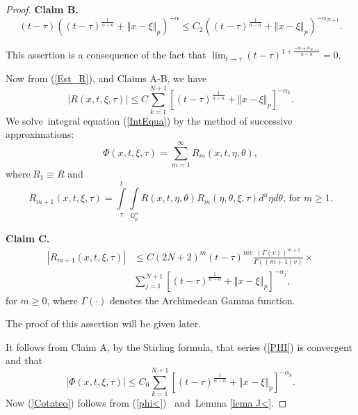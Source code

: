 \documentclass{amsart}\usepackage{amsfonts}
\theoremstyle{plain}
\numberwithin{equation}{section}
\begin{document}
\begin{proof}
\textbf{Claim B.}
\[
\left(  t-\tau\right)  ((t-\tau)^{\frac{1}{\alpha-n}}+\left\Vert
x-\xi\right\Vert _{p})^{-\alpha}\leq C_{2}((t-\tau)^{\frac{1}{\alpha-n}}+\left\Vert x-\xi\right\Vert _{p})^{-\alpha_{N+1}}.
\]


This assertion is a consequence of the fact that $\lim_{t\rightarrow\tau
}(t-\tau)^{1+\frac{-\alpha+\alpha_{N+1}}{\alpha-n}}=0$.

Now from (\ref{Est_R}), and Claims A-B, we have\begin{equation}
\left\vert R(x,t,\xi,\tau)\right\vert \leq C{\displaystyle\sum\limits_{k=1}^{N+1}}
\left[  (t-\tau)^{\frac{1}{\alpha-n}}+\left\Vert x-\xi\right\Vert _{p}\right]
^{-\alpha_{k}}. \label{R<}\end{equation}
We solve\ integral equation (\ref{IntEqua}) by the method of successive
approximations:\begin{equation}
\Phi(x,t,\xi,\tau)={\displaystyle\sum\limits_{m=1}^{\infty}}
R_{m}(x,t,\eta,\theta), \label{PHI}\end{equation}
where$\ R_{1}\equiv R$ and\[
R_{m+1}(x,t,\xi,\tau)={\displaystyle\int\limits_{\tau}^{t}}
\underset{\mathbb{Q}_{p}^{n}}{\int}R(x,t,\eta,\theta)R_{m}(\eta,\theta
,\xi,\tau)d^{n}\eta d\theta\text{, for\ }m\geq1.
\]


\textbf{Claim C.}\begin{align*}
\left\vert R_{m+1}(x,t,\xi,\tau)\right\vert  &  \leq C(2N+2)^{m}(t-\tau
)^{mv}\frac{\left(  \Gamma(v)\right)  ^{m+1}}{\Gamma((m+1)v)}\times\\
&
{\displaystyle\sum\limits_{j=1}^{N+1}}
\left[  (t-\tau)^{\frac{1}{\alpha-n}}+\left\Vert x-\xi\right\Vert _{p}\right]
^{-\alpha_{j}},
\end{align*}
for $m\geq0$, where $\Gamma\left(  \cdot\right)  $ denotes the Archimedean
Gamma function.

The proof of this assertion will be given later.

It follows from Claim A, by the Stirling formula, that series (\ref{PHI}) is
convergent and that\begin{equation}
\left\vert \Phi(x,t,\xi,\tau)\right\vert \leq C_{0}{\displaystyle\sum\limits_{k=1}^{N+1}}
\left[  (t-\tau)^{\frac{1}{\alpha-n}}+\left\Vert x-\xi\right\Vert _{p}\right]
^{-\alpha_{k}}. \label{phi<}\end{equation}
Now (\ref{Cotateo}) follows from (\ref{phi<}) \ and\ Lemma \ref{lema J<}.


\end{proof}
\end{document}
